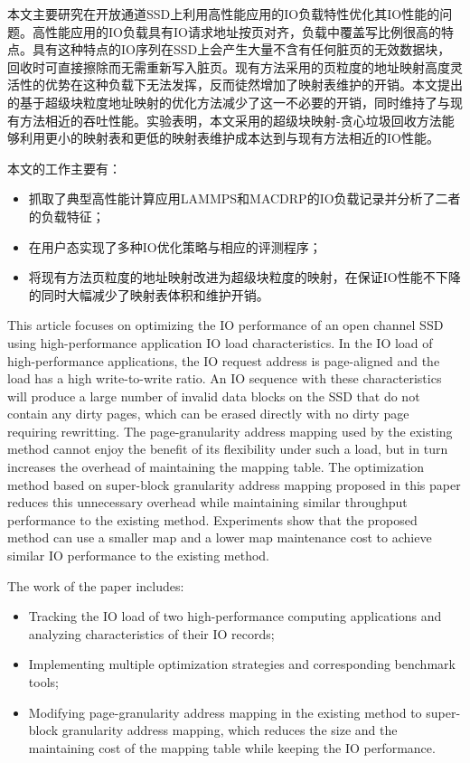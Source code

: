 \begin{cabstract}
  本文主要研究在开放通道SSD上利用高性能应用的IO负载特性优化其IO性能的问题。高性能应用的IO负载具有IO请求地址按页对齐，负载中覆盖写比例很高的特点。具有这种特点的IO序列在SSD上会产生大量不含有任何脏页的无效数据块，回收时可直接擦除而无需重新写入脏页。现有方法采用的页粒度的地址映射高度灵活性的优势在这种负载下无法发挥，反而徒然增加了映射表维护的开销。本文提出的基于超级块粒度地址映射的优化方法减少了这一不必要的开销，同时维持了与现有方法相近的吞吐性能。实验表明，本文采用的超级块映射-贪心垃圾回收方法能够利用更小的映射表和更低的映射表维护成本达到与现有方法相近的IO性能。

  本文的工作主要有：
  \begin{itemize}
    \item 抓取了典型高性能计算应用LAMMPS和MACDRP的IO负载记录并分析了二者的负载特征；
    \item 在用户态实现了多种IO优化策略与相应的评测程序；
    \item 将现有方法页粒度的地址映射改进为超级块粒度的映射，在保证IO性能不下降的同时大幅减少了映射表体积和维护开销。
  \end{itemize}
\end{cabstract}


\begin{eabstract}
  This article focuses on optimizing the IO performance of an open channel SSD using high-performance application IO load characteristics. In the IO load of high-performance applications, the IO request address is page-aligned and the load has a high write-to-write ratio. An IO sequence with these characteristics will produce a large number of invalid data blocks on the SSD that do not contain any dirty pages, which can be erased directly with no dirty page requiring rewritting. The page-granularity address mapping used by the existing method cannot enjoy the benefit of its flexibility under such a load, but in turn increases the overhead of maintaining the mapping table. The optimization method based on super-block granularity address mapping proposed in this paper reduces this unnecessary overhead while maintaining similar throughput performance to the existing method. Experiments show that the proposed method can use a smaller map and a lower map maintenance cost to achieve similar IO performance to the existing method.

  The work of the paper includes:
  \begin{itemize}
    \item Tracking the IO load of two high-performance computing applications and analyzing characteristics of their IO records;
    \item Implementing multiple optimization strategies and corresponding benchmark tools;
    \item Modifying page-granularity address mapping in the existing method to super-block granularity address mapping, which reduces the size and the maintaining cost of the mapping table while keeping the IO performance.
  \end{itemize}
\end{eabstract}

